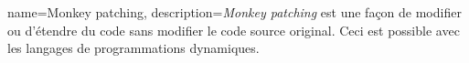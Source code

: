 \documentclass[a4paper,12pt,dvipsnames]{report}
\begin{document}
{
	name={Monkey patching},
	description={\textit{Monkey patching} est une façon de modifier ou d'étendre du code sans modifier le code source original. Ceci est possible avec les langages de programmations dynamiques.}  
}


\printglossaries


\nocite{*}
\cleardoublepage
{}
{}
\printbibliography
\end{document}
